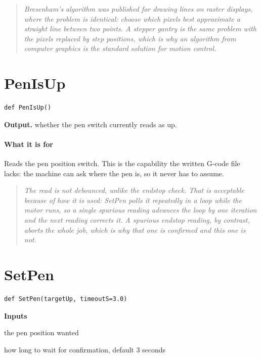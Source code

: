 \begin{quote}\small\itshape Bresenham's algorithm was published for drawing lines on raster displays, where the problem is identical: choose which pixels best approximate a straight line between two points. A stepper gantry is the same problem with the pixels replaced by step positions, which is why an algorithm from computer graphics is the standard solution for motion control.\end{quote}

\section{PenIsUp}
\begin{lstlisting}[style=sig]
def PenIsUp()
\end{lstlisting}

\noindent\textbf{Output.} whether the pen switch currently reads as up.


\paragraph{What it is for}
Reads the pen position switch. This is the capability the written G-code file lacks: the machine can ask where the pen is, so it never has to assume.


\begin{quote}\small\itshape The read is not debounced, unlike the endstop check. That is acceptable because of how it is used: SetPen polls it repeatedly in a loop while the motor runs, so a single spurious reading advances the loop by one iteration and the next reading corrects it. A spurious endstop reading, by contrast, aborts the whole job, which is why that one is confirmed and this one is not.\end{quote}

\section{SetPen}
\begin{lstlisting}[style=sig]
def SetPen(targetUp, timeoutS=3.0)
\end{lstlisting}

\noindent\textbf{Inputs}
\begin{description}[leftmargin=2.2em,style=nextline,font=\normalfont\ttfamily]\setlength\itemsep{1pt}
  \item[{targetUp}] \normalfont the pen position wanted
  \item[{timeoutS}] \normalfont how long to wait for confirmation, default 3 seconds
\end{description}


